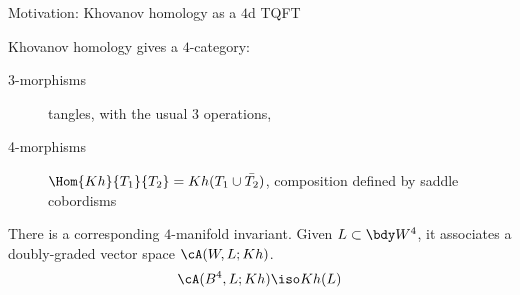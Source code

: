 \documentclass[beamer, compress]{beamer}
\begin{document}
\begin{frame}{Motivation: Khovanov homology as a $4$d TQFT}
\begin{thm}
Khovanov homology gives a $4$-category:
\begin{description}
\item[3-morphisms] tangles, with the usual $3$ operations,
\item[4-morphisms] $\Hom{Kh}{T_1}{T_2} = Kh(T_1 \cup \bar{T_2})$, composition defined by saddle cobordisms
\end{description}
\end{thm}
\begin{block}{}
There is a corresponding $4$-manifold invariant. Given $L \subset \bdy W^4$, it associates a doubly-graded vector space $\cA(W, L; Kh)$.
$$\cA(B^4, L; Kh) \iso Kh(L)$$
\end{block}
\end{frame}
\end{document}
